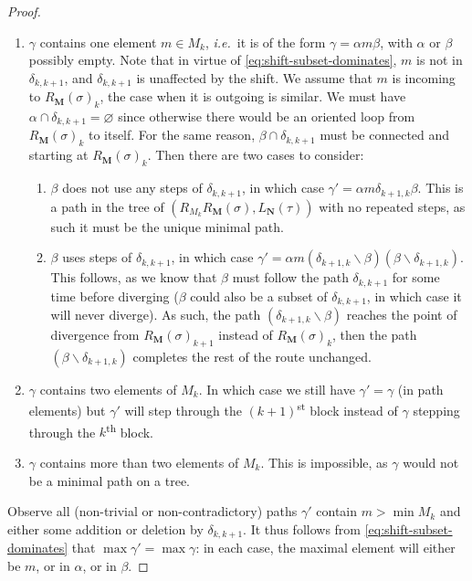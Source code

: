 \documentclass{amsart}
\theoremstyle{definition}
\newcommand{\ssm}{\smallsetminus} %
\newcommand{\ie}{\textit{i.e.}~} %
\newcommand{\ordinal}{\textsuperscript{th}} %
\newcommand{\ordinalst}{\textsuperscript{st}} %
\begin{document}
\begin{proof}
\begin{enumerate}
    \item $\gamma$ contains one element $m\in M_k$, \ie it is of the form $\gamma = \alpha m \beta$, with $\alpha$ or $\beta$ possibly empty.
    Note that in virtue of \cref{eq:shift-subset-dominates}, $m$ is not in $\delta_{k,k+1}$, and $\delta_{k,k+1}$ is unaffected by the shift. 
    We assume that $m$ is incoming to $R_\mathbf{M}(\sigma)_{k}$, the case when it is outgoing is similar.
    We must have $\alpha \cap \delta_{k,k+1}=\varnothing$ since otherwise there would be an oriented loop from $R_\mathbf{M}(\sigma)_{k}$ to itself.
    For the same reason, $\beta \cap \delta_{k,k+1}$ must be connected and starting at $R_\mathbf{M}(\sigma)_{k}$.
    Then there are two cases to consider:
    \begin{enumerate}

        \item $\beta$ does not use any steps of $\delta_{k,k+1}$, in which case $\gamma' = \alpha m \delta_{k+1,k} \beta$.
        This is a path in the tree of $(R_{M_k}R_{\mathbf{M}}(\sigma),L_{\mathbf{N}}(\tau))$ with no repeated steps, as such it must be the unique minimal path. 
        
        \item $\beta$ uses steps of $\delta_{k,k+1}$, in which case $\gamma' = \alpha m (\delta_{k+1,k}\ssm \beta)(\beta \ssm \delta_{k+1,k})$.
        This follows, as we know that $\beta$ must follow the path $\delta_{k,k+1}$ for some time before diverging ($\beta$ could also be a subset of $\delta_{k,k+1}$, in which case it will never diverge).
        As such, the path $(\delta_{k+1,k}\ssm \beta)$ reaches the point of divergence from $R_{\mathbf{M}}(\sigma)_{k+1}$ instead of $R_{\mathbf{M}}(\sigma)_{k}$, then the path $(\beta \ssm \delta_{k+1,k})$ completes the rest of the route unchanged.

    \end{enumerate}

    \item $\gamma$ contains two elements of $M_k$. In which case we still have $\gamma'=\gamma$ (in path elements) but $\gamma'$ will step through the $(k+1)$\ordinalst{} block instead of $\gamma$ stepping through the $k$\ordinal{} block.
    
    \item $\gamma$ contains more than two elements of $M_k$. 
    This is impossible, as $\gamma$ would not be a minimal path on a tree.

\end{enumerate}
Observe all (non-trivial or non-contradictory) paths $\gamma'$ contain $m>\min M_k$ and either some addition or deletion by $\delta_{k,k+1}$.
It thus follows from \cref{eq:shift-subset-dominates} that $\max \gamma' = \max \gamma$: in each case, the maximal element will either be $m$, or in $\alpha$, or in $\beta$.


\end{proof}
\end{document}
